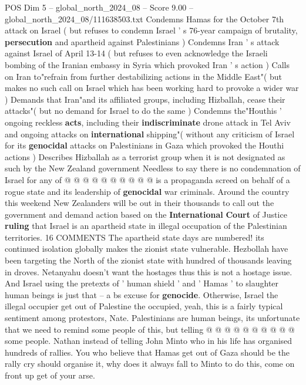 \begin{textsample}{POS Dim 5 – global\_north\_2024\_08 – Score 9.00 – global\_north\_2024\_08/111638503.txt}  \label{ex:f5_pos_400}
Condemns Hamas for the October 7th attack on Israel ( but refuses to condemn Israel ' s 76-year campaign of brutality, \textbf{persecution} and apartheid against Palestinians ) Condemns Iran ' s attack against Israel of April 13-14 ( but refuses to even acknowledge the Israeli bombing of the Iranian embassy in Syria which provoked Iran ' s action ) Calls on Iran to"refrain from further destabilizing actions in the Middle East"( but makes no such call on Israel which has been working hard to provoke a wider war ) Demands that Iran"and its affiliated groups, including Hizballah, cease their attacks"( but no demand for Israel to do the same ) Condemns the"Houthis ' ongoing reckless \textbf{acts}, including their \textbf{indiscriminate} drone attack in Tel Aviv and ongoing attacks on \textbf{international} shipping"( without any criticism of Israel for its \textbf{genocidal} attacks on Palestinians in Gaza which provoked the Houthi actions ) Describes Hizballah as a terrorist group when it is not designated as such by the New Zealand government Needless to say there is no condemnation of Israel for any of @ @ @ @ @ @ @ @ @ @ is a propaganda screed on behalf of a rogue state and its leadership of \textbf{genocidal} war criminals.
Around the country this weekend New Zealanders will be out in their thousands to call out the government and demand action based on the \textbf{International} \textbf{Court} of Justice \textbf{ruling} that Israel is an apartheid state in illegal occupation of the Palestinian territories. 16 COMMENTS The apartheid state days are numbered! its continued isolation globally makes the zionist state vulnerable.
Hezbollah have been targeting the North of the zionist state with hundred of thousands leaving in droves.
Netanyahu doesn't want the hostages thus this is not a hostage issue.
And Israel using the pretexts of ' human shield ' and ' Hamas ' to slaughter human beings is just that -- a bs excuse for \textbf{genocide}.
Otherwise, Israel the illegal occupier get out of Palestine the occupied, yeah, this is a fairly typical sentiment among protestors, Nate.
Palestinians are human beings, its unfortunate that we need to remind some people of this, but telling @ @ @ @ @ @ @ @ @ @ some people.
Nathan instead of telling John Minto who in his life has organised hundreds of rallies.
You who believe that Hamas get out of Gaza should be the rally cry should organise it, why does it always fall to Minto to do this, come on front up get of your arse.

\end{textsample}
